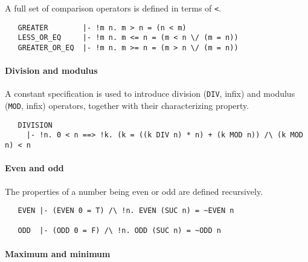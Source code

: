 A full set of comparison operators is defined in terms of \verb+<+.

\begin{hol}
{\small
\begin{verbatim}
   GREATER        |- !m n. m > n = (n < m)
   LESS_OR_EQ     |- !m n. m <= n = (m < n \/ (m = n))
   GREATER_OR_EQ  |- !m n. m >= n = (m > n \/ (m = n))
\end{verbatim}}
\end{hol}

\paragraph{Division and modulus}

A constant specification is used to introduce division ({\small\verb+DIV+}, infix) and
modulus ({\small\verb+MOD+}, infix) operators, together with their
characterizing property.
\begin{hol}
{\small
\begin{verbatim}
   DIVISION
     |- !n. 0 < n ==> !k. (k = ((k DIV n) * n) + (k MOD n)) /\ (k MOD n) < n
\end{verbatim}}
\end{hol}

\paragraph{Even and odd}

The properties of a number being even or odd are defined recursively.
%
\begin{hol}
{\small
\begin{verbatim}
   EVEN |- (EVEN 0 = T) /\ !n. EVEN (SUC n) = ~EVEN n

   ODD  |- (ODD 0 = F) /\ !n. ODD (SUC n) = ~ODD n
\end{verbatim}}
\end{hol}

\paragraph{Maximum and minimum}

